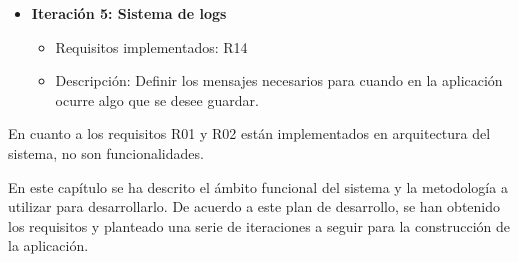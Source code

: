 \begin{itemize}
    \item {\bfseries Iteración 5: Sistema de logs}
    \begin{itemize}
        \item Requisitos implementados: R14
        \item Descripción: Definir los mensajes necesarios para cuando en la aplicación ocurre algo que se desee guardar.
    \end{itemize}
\end{itemize}


En cuanto a los requisitos R01 y R02 están implementados en arquitectura del sistema, no son funcionalidades.
\newline

En este capítulo se ha descrito el ámbito funcional del sistema y la metodología a utilizar para desarrollarlo. De acuerdo a este plan de desarrollo, se han obtenido los requisitos y planteado una serie de iteraciones a seguir para la construcción de la aplicación.
\newline













